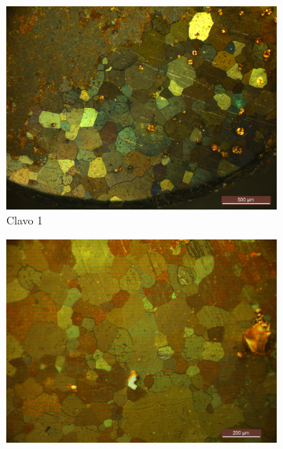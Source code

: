 \documentclass[a4paper,12pt,fleqn,twoside,openany]{book}
\begin{document}
  \begin{figure}%
    \centering
    
    ~ %
    \begin{subfigure}{0.3\textwidth}
        \includegraphics[width=\textwidth]{Img/Resultados/clavos/tg/Clavo1.jpg}
        \caption{Clavo 1}%
        \label{fig: MClavo1}
    \end{subfigure}
        \begin{subfigure}{0.3\textwidth}
        \includegraphics[width=\textwidth]{Img/Resultados/clavos/tg/Clavo2.jpg}

\end{subfigure}
\end{figure}
\end{document}
